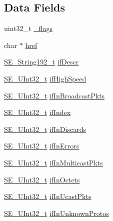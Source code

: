 \subsection*{Data Fields}
\begin{DoxyCompactItemize}
\item 
uint32\+\_\+t \hyperlink{group__IPInterface_gace4102e6c256f2507297836fe17fff28}{\+\_\+flags}
\item 
char $\ast$ \hyperlink{group__IPInterface_ga063592c47cab686db07cef148ff02329}{href}
\item 
\hyperlink{group__String192_ga25f61da2bbbdfe30dbf77fcbb7edd7d7}{S\+E\+\_\+\+String192\+\_\+t} \hyperlink{group__IPInterface_gaec54566a9473364a58578a49f9002bbf}{if\+Descr}
\item 
\hyperlink{group__UInt32_ga70bd4ecda3c0c85d20779d685a270cdb}{S\+E\+\_\+\+U\+Int32\+\_\+t} \hyperlink{group__IPInterface_ga9c845cec5282d48c7af1f5abb0aed20c}{if\+High\+Speed}
\item 
\hyperlink{group__UInt32_ga70bd4ecda3c0c85d20779d685a270cdb}{S\+E\+\_\+\+U\+Int32\+\_\+t} \hyperlink{group__IPInterface_gad538e5107f8d10a4363da4032e1f9b33}{if\+In\+Broadcast\+Pkts}
\item 
\hyperlink{group__UInt32_ga70bd4ecda3c0c85d20779d685a270cdb}{S\+E\+\_\+\+U\+Int32\+\_\+t} \hyperlink{group__IPInterface_gafa7cb533b5151c2ec6530e1eeafddb4d}{if\+Index}
\item 
\hyperlink{group__UInt32_ga70bd4ecda3c0c85d20779d685a270cdb}{S\+E\+\_\+\+U\+Int32\+\_\+t} \hyperlink{group__IPInterface_gaad6f4c9d559ab327e99768bf5c8ec5be}{if\+In\+Discards}
\item 
\hyperlink{group__UInt32_ga70bd4ecda3c0c85d20779d685a270cdb}{S\+E\+\_\+\+U\+Int32\+\_\+t} \hyperlink{group__IPInterface_gadd01660d9eaa51e1d1eb964318265e00}{if\+In\+Errors}
\item 
\hyperlink{group__UInt32_ga70bd4ecda3c0c85d20779d685a270cdb}{S\+E\+\_\+\+U\+Int32\+\_\+t} \hyperlink{group__IPInterface_ga010a8b6fd224af2ba1a415170fa49a23}{if\+In\+Multicast\+Pkts}
\item 
\hyperlink{group__UInt32_ga70bd4ecda3c0c85d20779d685a270cdb}{S\+E\+\_\+\+U\+Int32\+\_\+t} \hyperlink{group__IPInterface_ga52f2ce48f9f8e449c479cc9a9e548c93}{if\+In\+Octets}
\item 
\hyperlink{group__UInt32_ga70bd4ecda3c0c85d20779d685a270cdb}{S\+E\+\_\+\+U\+Int32\+\_\+t} \hyperlink{group__IPInterface_ga989594ca7b45d7a18e3f0e1942252bf0}{if\+In\+Ucast\+Pkts}
\item 
\hyperlink{group__UInt32_ga70bd4ecda3c0c85d20779d685a270cdb}{S\+E\+\_\+\+U\+Int32\+\_\+t} \hyperlink{group__IPInterface_ga3936236c0938472ca9307c318cc4f271}{if\+In\+Unknown\+Protos}

\end{DoxyCompactItemize}
